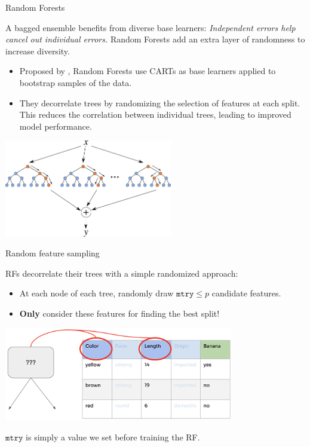 \documentclass[11pt,compress,t,notes=noshow, xcolor=table]{beamer}
\begin{document}
\begin{vbframe}{Random Forests}

A bagged ensemble benefits from diverse base learners: \textit{Independent errors help cancel out individual errors.} Random Forests add an extra layer of randomness to increase diversity.

\begin{itemize}
\item Proposed by , Random Forests use CARTs as base learners applied to bootstrap samples of the data.
\item They decorrelate trees by randomizing the selection of features at each split. This reduces the correlation between individual trees, leading to improved model performance.
\end{itemize}

\begin{center}
\includegraphics[width=0.55\textwidth]{figure_man/forest.png}
\end{center}

\end{vbframe}


\begin{vbframe}{Random feature sampling}

RFs decorrelate their trees with a simple randomized approach:

\begin{itemize}
  \item At each node of each tree, randomly draw $\texttt{mtry} \le p$ candidate features.
  \item \textbf{Only} consider these features for finding the best split!
\end{itemize}

\begin{center}
\includegraphics[width=0.75\textwidth]{figure_man/forest-feature-sampling.png}
\end{center}

$\texttt{mtry}$ is simply a value we set before training the RF.

\end{vbframe}
\end{document}
